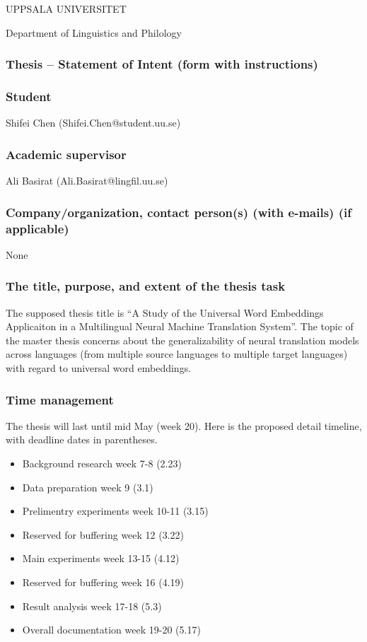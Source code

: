 \documentclass[a4paper,12pt]{article}
\begin{document}
\noindent UPPSALA UNIVERSITET

\noindent Department of Linguistics and Philology

\subsubsection*{Thesis -- Statement of Intent (form with instructions)}

\subsubsection*{Student}

Shifei Chen (Shifei.Chen@student.uu.se)

\subsubsection*{Academic supervisor}

Ali Basirat (Ali.Basirat@lingfil.uu.se)

\subsubsection*{Company/organization, contact person(s) (with e-mails) (if applicable)}

None

\subsubsection*{The title, purpose, and extent of the thesis task}

The supposed thesis title is ``A Study of the Universal Word Embeddings Applicaiton in a Multilingual Neural Machine Translation System''. The topic of the master thesis concerns about the generalizability of neural translation models across languages (from multiple source languages to multiple target languages) with regard to universal word embeddings.

\subsubsection*{Time management}

The thesis will last until mid May (week 20). Here is the proposed detail timeline, with deadline dates in parentheses.

\begin{itemize}
    \item Background research \hfill week 7-8 (2.23)
    \item Data preparation \hfill week 9 (3.1)
    \item Prelimentry experiments \hfill week 10-11 (3.15)
    \item Reserved for buffering \hfill week 12 (3.22)
    \item Main experiments \hfill week 13-15 (4.12)
    \item Reserved for buffering \hfill week 16 (4.19)
    \item Result analysis \hfill week 17-18 (5.3)
    \item Overall documentation \hfill week 19-20 (5.17)
\end{itemize}
\end{document}

